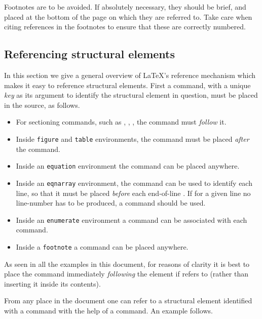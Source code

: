 \documentclass{cernrep}
\begin{document}
Footnotes are to be avoided. If absolutely necessary, they should be
brief, and placed at the bottom of the page on which they are referred
to. Take care when citing references in the footnotes to ensure that
these are correctly numbered.

\subsection{Referencing structural elements}
\label{sec:crossref}

In this section we give a general overview of \LaTeX's reference
mechanism which makes it easy to reference structural elements. First
a  command, with a unique \emph{key} as its argument to
identify the structural element in question, must be placed in the
source, as follows.

\begin{itemize}
\item For sectioning commands, such as ,
      , , the  command
      must \emph{follow} it.
\item Inside \texttt{figure} and \texttt{table} environments, the 
       command must be placed \emph{after} the 
      command.
\item Inside an \texttt{equation} environment the  command
      can be placed anywhere.
\item Inside an \texttt{eqnarray} environment, the  command
      can be used to identify each line, so that it must be placed
      \emph{before} each end-of-line \Lcs{\bs}. If for a given line no
      line-number has to be produced, a  command should
      be used.
\item Inside an \texttt{enumerate} environment a  command
      can be associated with each  command.
\item Inside a \texttt{footnote} a  command can be placed
      anywhere.
\end{itemize}
As seen in all the examples in this document, for reasons of clarity
it is best to place the  command immediately
\emph{following} the element if refers to (rather than inserting it
inside its contents).

From any place in the document one can refer to a structural element
identified with a  command with the help of a 
command. An example follows.
\end{document}
